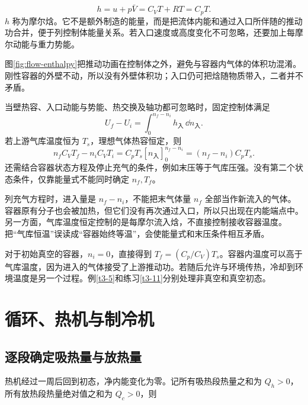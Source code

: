 \[h=u+p\bar V=C_VT+RT=C_pT.
\]
$h$ 称为摩尔焓。它不是额外制造的能量，而是把流体内能和通过入口所伴随的推动功合并，便于列控制体能量关系。若入口速度或高度变化不可忽略，还要加上每摩尔动能与重力势能。


图\ref{fig:flow-enthalpy}把推动功画在控制体之外，避免与容器内气体的体积功混淆。刚性容器的外壁不动，所以没有外壁体积功；入口仍可把焓随物质带入，二者并不矛盾。


当壁热容、入口动能与势能、热交换及轴功都可忽略时，固定控制体满足
\[U_f-U_i=\int_0^{n_f-n_i}h_{\text{入}}\,\dd n_{\text{入}}.
\]
若上游气库温度恒为 $T_s$，理想气体热容恒定，则
\[n_fC_VT_f-n_iC_VT_i
=C_pT_s[n_{\text{入}}]_0^{n_f-n_i}
=(n_f-n_i)C_pT_s.
\]
还需结合容器状态方程及停止充气的条件，例如末压等于气库压强。没有第二个状态条件，仅靠能量式不能同时确定 $n_f,T_f$。

列充气方程时，进入量是 $n_f-n_i$，不能把末气体量 $n_f$ 全部当作新流入的气体。容器原有分子也会被加热，但它们没有再次通过入口，所以只出现在内能端点中。另一方面，气库温度恒定控制的是每摩尔流入焓，不直接控制接收容器温度。把“气库恒温”误读成“容器始终等温”，会使能量式和末压条件相互矛盾。

对于初始真空的容器，$n_i=0$，直接得到 $T_f=(C_p/C_V)T_s$。容器内温度可以高于气库温度，因为进入的气体接受了上游推动功。若随后允许与环境传热，冷却到环境温度是另一个过程。例\ref{t3-5}和练习\ref{t3-11}分别处理非真空和真空初态。

\section{循环、热机与制冷机}
\subsection{逐段确定吸热量与放热量}
热机经过一周后回到初态，净内能变化为零。记所有吸热段热量之和为 $Q_h>0$，所有放热段热量绝对值之和为 $Q_c>0$，则

